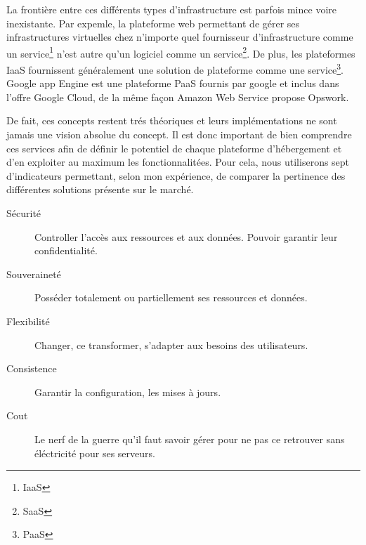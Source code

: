 \documentclass[11pt, a4paper ]{article}
\begin{document}
\begin{spacing}{1.5}
La frontière entre ces différents types d'infrastructure est parfois mince voire inexistante. Par expemle, la plateforme web permettant de gérer ses infrastructures virtuelles chez n'importe quel fournisseur d'infrastructure comme un service\footnote{IaaS} n'est autre qu'un logiciel comme un service\footnote{SaaS}. De plus, les plateformes IaaS fournissent généralement une solution de plateforme comme une service\footnote{PaaS}. Google app Engine est une plateforme PaaS fournis par google et inclus dans l'offre Google Cloud, de la même façon Amazon Web Service propose Opswork.

De fait, ces concepts restent trés théoriques et leurs implémentations ne sont jamais une vision absolue du concept. Il est donc important de bien comprendre ces services afin de définir le potentiel de chaque plateforme d'hébergement et d'en exploiter au maximum les fonctionnalitées.
Pour cela, nous utiliserons sept d'indicateurs permettant, selon mon expérience, de comparer la pertinence des différentes solutions présente sur le marché.

\begin{description}

	\item[Sécurité]
		Controller l'accès aux ressources et aux données. Pouvoir garantir leur confidentialité.

	\item[Souveraineté]
		Posséder totalement ou partiellement ses ressources et données.

	\item[Flexibilité]
		Changer, ce transformer, s'adapter aux besoins des utilisateurs.

	\item[Consistence]
		Garantir la configuration, les mises à jours.

	\item[Cout]
		Le nerf de la guerre qu'il faut savoir gérer pour ne pas ce retrouver sans éléctricité pour ses serveurs.


\end{description}
\end{spacing}
\end{document}

